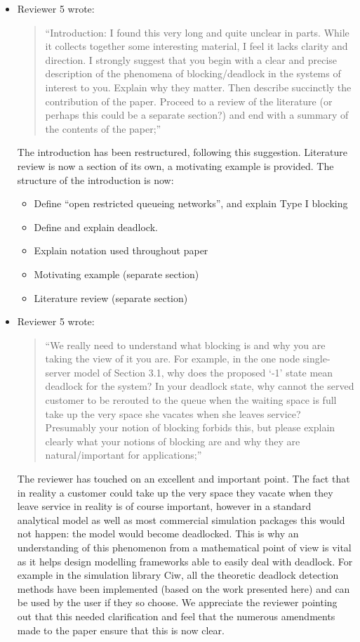 \documentclass{article}
\begin{document}
\begin{itemize}
\item Reviewer 5 wrote:
\begin{quote}
``Introduction: I found this very long and quite unclear in parts.
While it collects together some interesting material, I feel it lacks clarity
and direction.
I strongly suggest that you begin with a clear and precise description of the
phenomena of blocking/deadlock in the systems of interest to you.
Explain why they matter.
Then describe succinctly the contribution of the paper.
Proceed to a review of the literature (or perhaps this could be a separate
section?) and end with a summary of the contents of the paper;''
\end{quote}
The introduction has been restructured, following this suggestion.
Literature review is now a section of its own, a motivating example is
provided.
The structure of the introduction is now:
\begin{itemize}
\item Define ``open restricted queueing networks'', and explain Type I blocking
\item Define and explain deadlock.
\item Explain notation used throughout paper
\item Motivating example (separate section)
\item Literature review (separate section)
\end{itemize}

\item Reviewer 5 wrote:
\begin{quote}
``We really need to understand what blocking is and why you are taking the
view of it you are.
For example, in the one node single-server model of Section 3.1, why does the
proposed ‘-1’ state mean deadlock for the system?
In your deadlock state, why cannot the served customer to be rerouted to the
queue when the waiting space is full take up the very space she vacates when
she leaves service?
Presumably your notion of blocking forbids this, but please explain clearly
what your notions of blocking are and why they are natural/important for
applications;''
\end{quote}

The reviewer has touched on an excellent and important point.
The fact that in reality a customer could take up the very space they vacate
when they leave service in reality is of course important, however in a
standard analytical model as well as most commercial simulation packages
this would not happen: the model would become deadlocked.
This is why an understanding of this phenomenon from a mathematical point of
view is vital as it helps design modelling frameworks able to easily deal with
deadlock.
For example in the simulation library Ciw, all the theoretic deadlock detection
methods have been implemented (based on the work presented here) and can be used
by the user if they so choose.
We appreciate the reviewer pointing out that this needed clarification and feel
that the numerous amendments made to the paper ensure that this is now clear.


\end{itemize}
\end{document}
